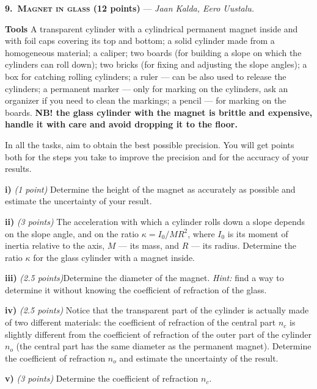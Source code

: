 \textbf{9.\ \textsc{Magnet in glass} (12 points)} --- \textit{Jaan Kalda, Eero Uustalu.}

\textbf{Tools} A transparent cylinder with a cylindrical permanent magnet inside
and with foil caps covering its top and bottom; a solid cylinder made from a
homogeneous material; a caliper; two boards (for building a slope on which the
cylinders can roll down); two bricks (for fixing and adjusting the slope
angles); a box for catching rolling cylinders; a ruler --- can be also used to
release the cylinders; a permanent marker --- only for marking on the
cylinders, ask an organizer if you need to clean the markings; a pencil --- for
marking on the boards. \textbf{NB! the glass cylinder with the magnet is
brittle and expensive, handle it with care and avoid dropping it to the
floor.}

In all the tasks, aim to obtain the best possible precision. You will get
points both for the steps you take to improve the precision and for the
accuracy of your results.

\textbf{i)} \textit{(1 point)} Determine the height of the magnet as accurately
as possible and estimate the uncertainty of your result.

\textbf{ii)} \textit{(3 points)} The acceleration with which a cylinder rolls
down a slope depends on the slope angle, and on the ratio
$\kappa = I_0/MR^2$, where $I_0$ is its moment of inertia relative to the axis,
$M$ --- its mass, and $R$ --- its radius. Determine the ratio $\kappa$ for the
glass cylinder with a magnet inside.

\textbf{iii)} \textit{(2.5 points)}Determine the diameter of the magnet.
\textit{Hint:} find a way to determine it without knowing the coefficient of
refraction of the glass.

\textbf{iv)} \textit{(2.5 points)} Notice that the transparent part of the
cylinder is actually made of two different materials: the coefficient of
refraction of the central part $n_c$ is slightly different from the coefficient
of refraction of the outer part of the cylinder $n_o$ (the central part has the
same diameter as the permanent magnet). Determine the coefficient of refraction
$n_o$ and estimate the uncertainty of the result.

\textbf{v)} \textit{(3 points)} Determine the coefficient of refraction $n_c$.
